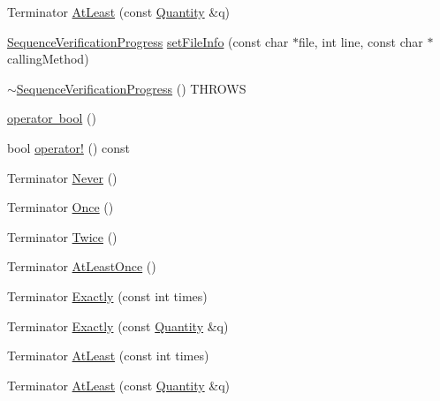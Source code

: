 \begin{DoxyCompactItemize}
\item 
Terminator \mbox{\hyperlink{classfakeit_1_1SequenceVerificationProgress_a1f6e949249d3f8119e920f6df6f7ade2}{At\+Least}} (const \mbox{\hyperlink{structfakeit_1_1Quantity}{Quantity}} \&q)
\item 
\mbox{\hyperlink{classfakeit_1_1SequenceVerificationProgress}{Sequence\+Verification\+Progress}} \mbox{\hyperlink{classfakeit_1_1SequenceVerificationProgress_aeeadb72fd4e0f52c06fa28c6b54d8188}{set\+File\+Info}} (const char $\ast$file, int line, const char $\ast$calling\+Method)
\item 
\mbox{\hyperlink{classfakeit_1_1SequenceVerificationProgress_a2c3325aa3d50002ef448d31e21494f76}{$\sim$\+Sequence\+Verification\+Progress}} () T\+H\+R\+O\+WS
\item 
\mbox{\hyperlink{classfakeit_1_1SequenceVerificationProgress_a462f6bec1f00814e918f9be6bd5f84e6}{operator bool}} ()
\item 
bool \mbox{\hyperlink{classfakeit_1_1SequenceVerificationProgress_a43f9268650854f97cbae3b28487c2be0}{operator!}} () const
\item 
Terminator \mbox{\hyperlink{classfakeit_1_1SequenceVerificationProgress_ad71678d34cb297945ecad2e1fe825f31}{Never}} ()
\item 
Terminator \mbox{\hyperlink{classfakeit_1_1SequenceVerificationProgress_a4a3260eb1380fcee1c0d8ae162ea57f4}{Once}} ()
\item 
Terminator \mbox{\hyperlink{classfakeit_1_1SequenceVerificationProgress_ac453e14db60c17c23748cc5f4f2325ca}{Twice}} ()
\item 
Terminator \mbox{\hyperlink{classfakeit_1_1SequenceVerificationProgress_a682eed8897bda26aa2927f0a0b03f0b1}{At\+Least\+Once}} ()
\item 
Terminator \mbox{\hyperlink{classfakeit_1_1SequenceVerificationProgress_a74c04958c69e3c977ce873de3787305d}{Exactly}} (const int times)
\item 
Terminator \mbox{\hyperlink{classfakeit_1_1SequenceVerificationProgress_abb39ac5b5e16e07b1caaf01325228c47}{Exactly}} (const \mbox{\hyperlink{structfakeit_1_1Quantity}{Quantity}} \&q)
\item 
Terminator \mbox{\hyperlink{classfakeit_1_1SequenceVerificationProgress_a83ba8d481bb79dad783f9bc821dd650e}{At\+Least}} (const int times)
\item 
Terminator \mbox{\hyperlink{classfakeit_1_1SequenceVerificationProgress_a1f6e949249d3f8119e920f6df6f7ade2}{At\+Least}} (const \mbox{\hyperlink{structfakeit_1_1Quantity}{Quantity}} \&q)
\item 

\end{DoxyCompactItemize}
